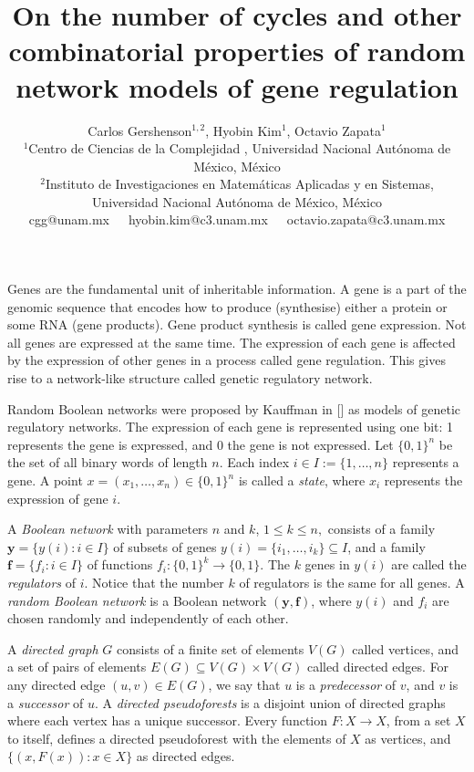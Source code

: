 \documentclass[letterpaper]{article}
\title{On the number of cycles and other combinatorial properties of random network models of gene regulation}
\author{
Carlos Gershenson$^{1,2}$, Hyobin Kim$^1$, Octavio Zapata$^1$
\mbox{}\\
$^{1}$Centro de Ciencias de la Complejidad , Universidad Nacional Aut\'onoma de M\'exico, M\'exico \\
$^2$Instituto de Investigaciones en Matem\'aticas Aplicadas y en Sistemas, Universidad Nacional Aut\'onoma de M\'exico, M\'exico \\
cgg@unam.mx\ \ \ 
hyobin.kim@c3.unam.mx\ \ \ 
octavio.zapata@c3.unam.mx} %
\begin{document}
\maketitle
Genes are the fundamental unit of inheritable information. 
A gene is a part of the genomic sequence that encodes how to produce (synthesise) either a protein or some RNA (gene products). 
Gene product synthesis is called gene expression. 
Not all genes are expressed at the same time.
The expression of each gene is affected by the expression of other genes in a process called gene regulation. 
This gives rise to a network-like structure called genetic regulatory network. %

Random Boolean networks were proposed by Kauffman in [] as models of genetic regulatory networks.
 The expression of each gene is represented using one bit: 1 represents the gene is expressed, and 0  the gene is not expressed.
Let $\{0,1\}^n$ be the set of all binary words of length $n$. Each index $i\in I:=\{1,\dots,n\}$ represents a gene. A point $x=(x_1,\dots, x_n)\in \{0,1\}^n$ is called  a \emph{state}, where $x_i$ represents the expression of  gene $i$.

A \emph{Boolean network} with parameters $n$ and $k$, $1\leq k\leq n,$ 
consists of a family 
$\mathbf{y}=\{y(i):i\in I\}$
of
subsets of genes $y(i)=\{i_1,\dots,i_k\}\subseteq I$, and a family $\mathbf{f}=\{f_i: i\in I\}$ of functions $f_i\colon \{0,1\}^{k}\rightarrow \{0,1\}$. 
The $k$ genes in $y(i)$ are called the \emph{regulators} of $i$.
Notice that the number $k$ of regulators is the same for all genes.
A \emph{random Boolean network} is a Boolean network $(\mathbf{y},\mathbf{f})$, where   $y(i)$ and $f_i$ are chosen randomly and  independently of each other. %
 
 A \emph{directed graph} $G$ consists of a finite set of elements $V(G)$ called vertices, and a set of pairs of elements $E(G)\subseteq V(G)\times V(G)$ called directed edges.  
For any directed edge $(u,v)\in E(G)$, we say that $u$ is a \emph{predecessor} of $v$, and $v$ is a \emph{successor} of $u$. 
A \emph{directed pseudoforests} is a disjoint union of directed graphs where each vertex has a unique successor.  
Every function $F\colon X\to X$,  from a set $X$ to itself, defines a directed pseudoforest with the elements of $X$
as vertices, and $\{(x, F(x)):x\in X\}$ as directed edges.
\end{document}
